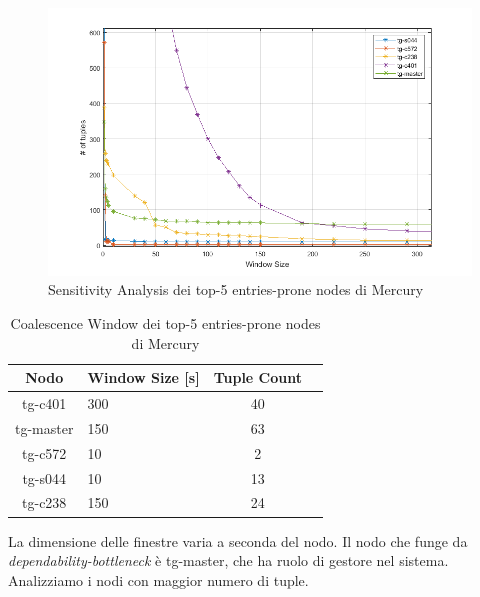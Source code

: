 		\begin{figure}[H]
			\centering
			\includegraphics[scale=0.7]{./immagine/nodiMcwin.png}
			\caption{Sensitivity Analysis dei top-5 entries-prone nodes di Mercury}
			\label{fig:ffda-nMcwin}
		\end{figure}
	
		\begin{table}
			\footnotesize
			\caption{Coalescence Window dei top-5 entries-prone nodes di Mercury}
			\label{tab:ffda-nMcwin}
			\centering
			\begin{tabular}{clcc}
				\toprule
				\textbf{Nodo} &
				\textbf{Window Size [s]} &
				\textbf{Tuple Count}\\
				\midrule
				tg-c401 &
				300 &
				40\\
				\midrule
				tg-master &
				150 &
				63\\
				\midrule
				tg-c572 &
				10 &
				2\\
				\midrule
				tg-s044 &
				10 &
				13\\
				\midrule
				tg-c238 &
				150 &
				24\\
				\bottomrule			
			\end{tabular}
		\end{table}
		La dimensione delle finestre varia a seconda del nodo. Il nodo che funge da \emph{dependability-bottleneck} è tg-master, che ha ruolo di gestore nel sistema. Analizziamo i nodi con maggior numero di tuple.
		
